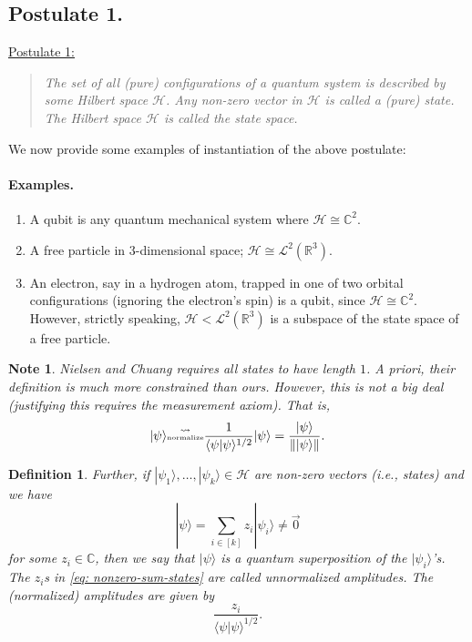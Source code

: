 \documentclass{article}
\newtheorem*{dfn}{Definition}
\newtheorem*{note}{Note}
\newcommand{\ket}[1]{|#1\rangle}
\newcommand{\braket}[2]{\langle#1|#2\rangle}
\newcommand{\norm}[1]{\left\lVert #1 \right\rVert}
\newcommand{\bbC}{\mathbb{C}}
\newcommand{\calH}{\mathcal{H}}
\newcommand{\qbit}{\bbC^2}
\begin{document}
\subsection{Postulate 1.}
\begin{framed}
\underline{Postulate 1:}
\begin{quote}
\textit{The set of all (pure) configurations of a quantum system is described by some Hilbert space $\calH$. Any non-zero vector in $\calH$ is called a {\em (pure) state}. The Hilbert space $\calH$ is called the {\em state space}.}
\end{quote}
\end{framed}
We now provide some examples of instantiation of the above postulate:

\paragraph{Examples.}
\begin{enumerate}
    \item A qubit is any quantum mechanical system where $\calH \cong \bbC^2$.
    \item A free particle in $3$-dimensional space; $\calH \cong \mathcal{L}^2(\mathbb{R}^3)$.
    \item An electron, say in a hydrogen atom, trapped in one of two orbital configurations (ignoring the electron's spin) is a qubit, since $\calH \cong \qbit$. However, strictly speaking, $\calH < \mathcal{L}^2(\mathbb{R}^3)$ is a subspace of the state space of a free particle.
\end{enumerate}

\begin{note}
    Nielsen and Chuang requires all states to have length $1$. A priori, their definition is much more constrained than ours. However, this is not a big deal (justifying this requires the measurement axiom). That is,
    \[
    \ket{\psi} \overset{{\Large \leadsto}}{\text{\tiny normalize}} \frac{1}{\braket{\psi}{\psi}^{1/2}} \ket{\psi} = \frac{\ket{\psi}}{\norm{\ket{\psi}}}.
    \]
\end{note}
\begin{dfn}
Further, if $\ket{\psi_1}, \ldots, \ket{\psi_k} \in \calH$ are non-zero vectors (i.e., states) and we have
\begin{equation}
    \label{eq: nonzero-sum-states}
    \ket{\psi} = \sum_{i \in [k]} z_i \ket{\psi_i} \neq \Vec{0}
\end{equation}
for some $z_i \in \bbC$, then we say that $\ket{\psi}$ is a {\em quantum superposition} of the $\ket{\psi_i}$'s. The $z_i$s in \eqref{eq: nonzero-sum-states} are called unnormalized amplitudes. The {\em (normalized) amplitudes} are given by \[\frac{z_i}{\braket{\psi}{\psi}^{1/2}}.\]
\end{dfn}
\end{document}
